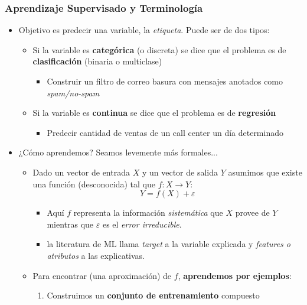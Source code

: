 \documentclass[leqno, 10pt, envcountsect]{beamer}
\numberwithin{equation}{section}
\theoremstyle{definition}
\theoremstyle{example}
\numberwithin{figure}{section}
\numberwithin{table}{section}
\let\olditem\item
\renewcommand{\item}{%
\olditem\vspace{1pt}}
\begin{document}
\begin{frame}
  \frametitle{Aprendizaje Supervisado y Terminología}
  \begin{itemize}
    \item Objetivo es predecir una variable, la \textit{etiqueta}. Puede ser de
      dos tipos:
      \begin{itemize}
        \item Si la variable es \textbf{categórica} (o discreta) se dice que el
          problema es de \textbf{clasificación} (binaria o multiclase)
          \begin{itemize}
            \item Construir un filtro de correo basura con mensajes anotados
              como \textit{spam/no-spam}
          \end{itemize}
        \item Si la variable es \textbf{continua} se dice que el
          problema es de \textbf{regresión}
          \begin{itemize}
            \item Predecir cantidad de ventas de un call center un día
              determinado
          \end{itemize}
      \end{itemize}
    \item ¿Cómo aprendemos? Seamos levemente más formales...
      \begin{itemize}
        \item Dado un vector de entrada $X$ y un vector de salida $Y$
          asumimos que existe una función (desconocida) tal que $f: X \to Y$:
          \begin{equation*}
            Y = f(X) +  \varepsilon
          \end{equation*}
          \begin{itemize}
            \item Aquí $f$ representa la información \textit{sistemática} que
              $X$ provee de $Y$ mientras que $\varepsilon$ es el \textit{error
              irreducible}.
          \item la literatura de ML llama \textit{target} a la variable
            explicada y \textit{features o atributos} a las explicativas.
          \end{itemize}
        \item Para encontrar (una aproximación) de $f$, \textbf{aprendemos por
          ejemplos}:
          \begin{enumerate}
            \item Construimos un \textbf{conjunto de entrenamiento} compuesto

\end{enumerate}
\end{itemize}
\end{itemize}
\end{frame}
\end{document}
